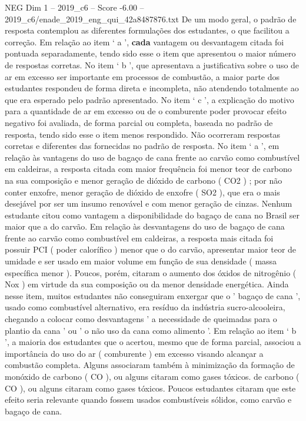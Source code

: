 \begin{textsample}{NEG Dim 1 – 2019\_c6 – Score -6.00 – 2019\_c6/enade\_2019\_eng\_qui\_42a8487876.txt}
De um modo geral, o padrão de resposta contemplou as diferentes formulações dos estudantes, o que facilitou a correção.
Em relação ao item ‘ a ’, \textbf{cada} vantagem ou desvantagem citada foi pontuada separadamente, tendo sido esse o item que apresentou o maior número de respostas corretas.
No item ‘ b ’, que apresentava a justificativa sobre o uso de ar em excesso ser importante em processos de combustão, a maior parte dos estudantes respondeu de forma direta e incompleta, não atendendo totalmente ao que era esperado pelo padrão apresentado.
No item ‘ c ’, a explicação do motivo para a quantidade de ar em excesso ou de o comburente poder provocar efeito negativo foi avaliada, de forma parcial ou completa, baseada no padrão de resposta, tendo sido esse o item menos respondido.
Não ocorreram respostas corretas e diferentes das fornecidas no padrão de resposta.
No item ‘ a ’, em relação às vantagens do uso de bagaço de cana frente ao carvão como combustível em caldeiras, a resposta citada com maior frequência foi menor teor de carbono na sua composição e menor geração de dióxido de carbono ( CO2 ) ; por não conter enxofre, menor geração de dióxido de enxofre ( SO2 ), que era o mais desejável por ser um insumo renovável e com menor geração de cinzas.
Nenhum estudante citou como vantagem a disponibilidade do bagaço de cana no Brasil ser maior que a do carvão.
Em relação às desvantagens do uso de bagaço de cana frente ao carvão como combustível em caldeiras, a resposta mais citada foi possuir PCI ( poder calorífico ) menor que o do carvão, apresentar maior teor de umidade e ser usado em maior volume em função de sua densidade ( massa específica menor ).
Poucos, porém, citaram o aumento dos óxidos de nitrogênio ( Nox ) em virtude da sua composição ou da menor densidade energética.
Ainda nesse item, muitos estudantes não conseguiram enxergar que o ' bagaço de cana ', usado como combustível alternativo, era resíduo da indústria sucro-alcooleira, chegando a colocar como desvantagens ' a necessidade de queimadas para o plantio da cana ' ou ' o não uso da cana como alimento '.
Em relação ao item ‘ b ’, a maioria dos estudantes que o acertou, mesmo que de forma parcial, associou a importância do uso do ar ( comburente ) em excesso visando alcançar a combustão completa.
Alguns associaram também à minimização da formação de monóxido de carbono ( CO ), ou alguns citaram como gases tóxicos. de carbono ( CO ), ou alguns citaram como gases tóxicos.
Poucos estudantes citaram que este efeito seria relevante quando fossem usados combustíveis sólidos, como carvão e bagaço de cana.

\end{textsample}
